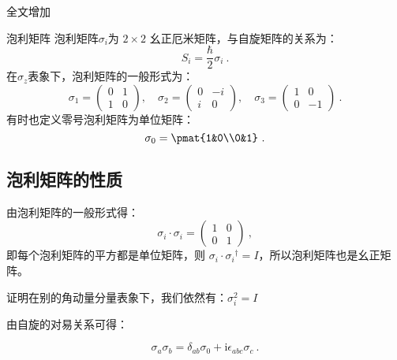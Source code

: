 
\begin{issues}
\issueDraft 全文增加\hat
\end{issues}


\begin{definition}{泡利矩阵}\label{def_pauliM_1}
泡利矩阵$\sigma_i$为 $2\times 2$ 幺正厄米矩阵，与自旋矩阵的关系为：
\begin{equation}
S_i=\frac{\hbar}{2}\sigma_i~.
\end{equation}
在$\sigma_z$表象下，泡利矩阵的一般形式为：
\begin{equation}
\sigma_1 = \begin{pmatrix}
0 & 1\\
1 & 0
\end{pmatrix},\quad 
\sigma_2 = \begin{pmatrix}
0 & -i\\
i & 0
\end{pmatrix},\quad 
\sigma_3 = 
\begin{pmatrix}
1 & 0\\
0 & -1
\end{pmatrix}
~.
\end{equation}
有时也定义零号泡利矩阵为单位矩阵：
\begin{equation}
\sigma_0 = \pmat{1&0\\0&1}~.
\end{equation}

\end{definition}

\subsection{泡利矩阵的性质}
由泡利矩阵的一般形式得：
\begin{equation}
\sigma_i\cdot \sigma_i = \begin{pmatrix}1&0\\0&1\end{pmatrix}~,
\end{equation}
即每个泡利矩阵的平方都是单位矩阵，则 $\sigma_i \cdot  \sigma_i{}^\dagger = I$，所以泡利矩阵也是幺正矩阵。
\begin{exercise}{}
证明在别的角动量分量表象下，我们依然有：$\sigma_i^2=I$
\end{exercise}

由自旋的对易关系可得：
\begin{theorem}{}
\begin{equation}\label{eq_pauliM_1}
\sigma_a\sigma_b = \delta_{ab}\sigma_0 + \mathrm{i}\epsilon_{abc}\sigma_c~.
\end{equation}
\end{theorem}



